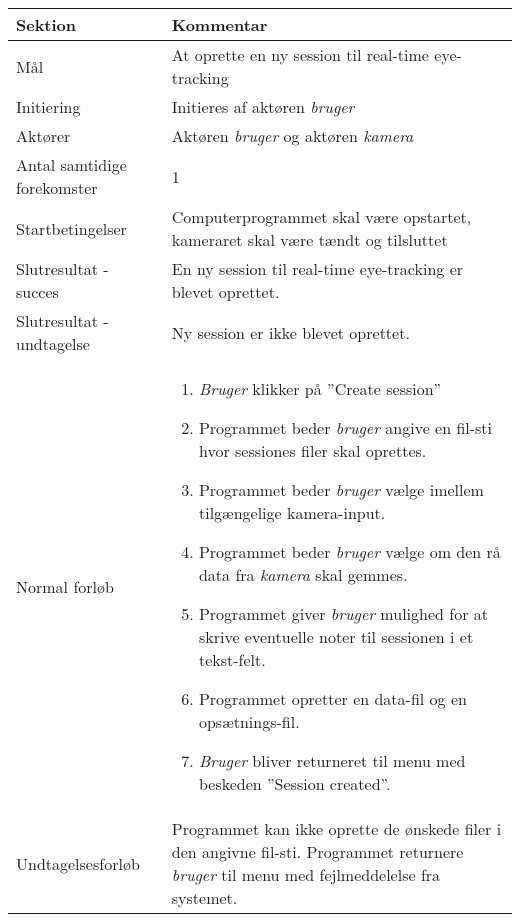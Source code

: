 \documentclass[rapport.tex]{subfiles}
\begin{document}
		\begin{tabular}{|l|p{7.7cm}|}
			\hline \textbf{Sektion} & \textbf{Kommentar} \\ 
			\hline Mål & At oprette en ny session til real-time eye-tracking \\ 
			\hline Initiering & Initieres af aktøren \textit{bruger} \\ 
			\hline Aktører & Aktøren \textit{bruger} og aktøren \textit{kamera}\\ 
			\hline Antal samtidige forekomster & 1 \\ 
			\hline Startbetingelser & Computerprogrammet skal være opstartet, kameraret skal være tændt og tilsluttet \\ 	
			\hline Slutresultat - succes & En ny session til real-time eye-tracking er blevet oprettet. \\ 
			\hline Slutresultat - undtagelse &  Ny session er ikke blevet oprettet. \\ 
			\hline Normal forløb & \begin{enumerate}
				\item \textit{Bruger} klikker på ”Create session”
				\item Programmet beder \textit{bruger} angive en fil-sti hvor sessiones filer skal oprettes.
				\item Programmet beder \textit{bruger} vælge imellem tilgængelige kamera-input.
				\item Programmet beder \textit{bruger} vælge om den rå data fra \textit{kamera} skal gemmes.
				
				
				\item Programmet giver \textit{bruger} mulighed for at skrive eventuelle noter til sessionen i et tekst-felt. 
				\item Programmet opretter en data-fil og en opsætnings-fil.
				\item \textit{Bruger} bliver returneret til menu med beskeden ”Session created”.
				
			\end{enumerate} \\ 
			\hline Undtagelsesforløb & Programmet kan ikke oprette de ønskede filer i den angivne fil-sti. Programmet returnere \textit{bruger} til menu med fejlmeddelelse fra systemet.  \\ 
			\hline 
		\end{tabular} \\ \\
\end{document}
